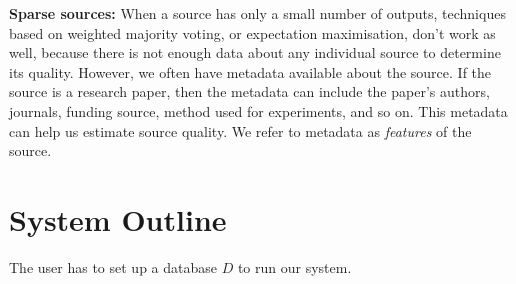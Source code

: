 \documentclass{sig-alternate}
\newcounter{prob}
\newcommand{\stitle}[1]{\vspace{0.5em}\noindent\textbf{#1}}
\begin{document}
\stitle{Sparse sources:} When a source has only a small number of outputs, techniques based on weighted majority voting, or expectation maximisation, don't work as well, because there is not enough data about any individual source to determine its quality. However, we often have metadata available about the source. If the source is a research paper, then the metadata can include the paper's authors, journals, funding source, method used for experiments, and so on. This metadata can help us estimate source quality. We refer to metadata as {\em features} of the source. 

\section{System Outline} 

The user has to set up a database $D$ to run our system.
\end{document}
